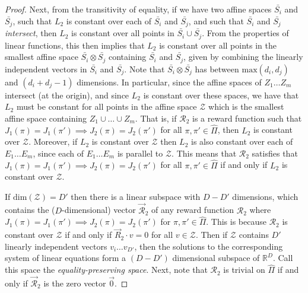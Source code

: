 \begin{proof}
Next, from the transitivity of equality, if we have two affine spaces $\bar{S_i}$ and $\bar{S_j}$, such that $L_2$ is constant over each of $\bar{S_i}$ and $\bar{S_j}$, and such that $\bar{S_i}$ and $\bar{S_j}$ \emph{intersect}, then $L_2$ is constant over all points in $\bar{S_i} \cup \bar{S_j}$. From the properties of linear functions, this then implies that $L_2$ is constant over all points in the smallest affine space $\bar{S_i}\otimes\bar{S_j}$ containing $\bar{S_i}$ and $\bar{S_j}$, given by combining the linearly independent vectors in $\bar{S_i}$ and $\bar{S_j}$.
Note that $\bar{S_i}\otimes\bar{S_j}$ has between $\mathrm{max}(d_i,d_j)$ and $(d_i + d_j - 1)$ dimensions.
In particular, since the affine spaces of $Z_1 \dots Z_m$ intersect (at the origin), and since $L_2$ is constant over these spaces, we have that $L_2$ must be constant for all points in the affine space $\mathcal{Z}$ 
which is the smallest affine space containing
$Z_1 \cup \dots \cup Z_m$. That is, if $\mathcal{R}_2$ is a reward function such that $J_1(\pi) = J_1(\pi') \implies J_2(\pi) = J_2(\pi')$ for all $\pi,\pi' \in \hat{\Pi}$, then $L_2$ is constant over $\mathcal{Z}$. Moreover, if $L_2$ is constant over $\mathcal{Z}$ then $L_2$ is also constant over each of $E_1 \dots E_m$, since each of $E_1 \dots E_m$ is parallel to $\mathcal{Z}$. This means that $\mathcal{R}_2$ satisfies that $J_1(\pi) = J_1(\pi') \implies J_2(\pi) = J_2(\pi')$ for all $\pi,\pi' \in \hat{\Pi}$ if and only if $L_2$ is constant over $\mathcal{Z}$.

If $\mathrm{dim}(\mathcal{Z}) = D'$ then there is a linear subspace with $D - D'$ dimensions, which contains the ($D$-dimensional) vector $\vec{\mathcal{R}}_2$ of any reward function $\mathcal{R}_2$ where $J_1(\pi) = J_1(\pi') \implies J_2(\pi) = J_2(\pi')$ for $\pi,\pi' \in \hat{\Pi}$. This is because $\mathcal{R}_2$ is constant over $\mathcal{Z}$ if and only if $\vec{R}_2 \cdot v = 0$ for all $v \in \mathcal{Z}$. Then if $\mathcal{Z}$ contains $D'$ linearly independent vectors $v_i \dots v_{D'}$, then the solutions to the corresponding system of linear equations form a $(D - D')$ dimensional subspace of $\mathbb{R}^D$.
Call this space the \emph{equality-preserving space}. Next, note that $\mathcal{R}_2$ is trivial on $\hat{\Pi}$ if and only if $\vec{\mathcal{R}}_2$ is the zero vector $\vec{0}$.


\end{proof}
